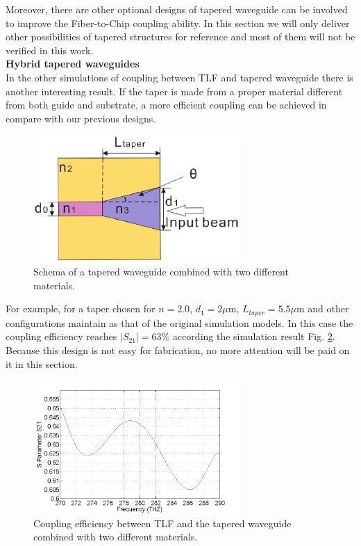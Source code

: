 Moreover, there are other optional designs of tapered waveguide can be involved to improve the Fiber-to-Chip coupling ability. In this section we will only deliver other possibilities of tapered structures for reference and most of them will not be verified in this work.   \\
\textbf{Hybrid tapered waveguides}\\  
In the other simulations of coupling between TLF and tapered waveguide there is another interesting result. If the taper is made from a proper material different from both guide and substrate, a more efficient coupling can be achieved in compare with our previous designs. 
\begin{figure}[!ht]
\centering
\includegraphics[width=0.7\textwidth]{bilder/tapered_waveguide_others}
\caption{Schema of a tapered waveguide combined with two different materials.}
\label{fig:tapered_waveguide_others}
\end{figure}
For example, for a taper chosen for $n=2.0$, $d_{1}=2\mu$m, $L_{taper}=5.5\mu$m and other configurations maintain as that of the original simulation models. In this case the coupling efficiency reaches $|S_{21}|=63\%$ according the simulation result Fig. \ref{fig:tapered_waveguide_others_coupling}.  Because this design is not easy for fabrication, no more attention will be paid on it in this section.   
\begin{figure}[!ht]
\centering
\includegraphics[width=0.7\textwidth]{bilder/s21_tapered_waveguide_others}
\caption{Coupling efficiency between TLF and the tapered waveguide combined with two different materials.}
\label{fig:tapered_waveguide_others_coupling}
\end{figure}


